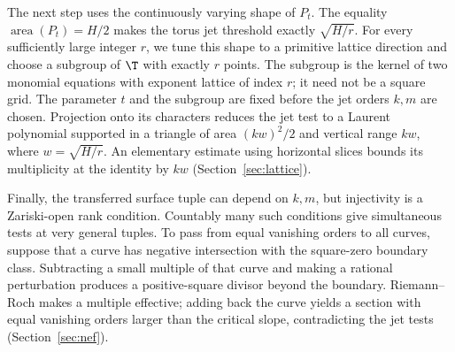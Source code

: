 The next step uses the continuously varying shape of $P_t$. The equality
$\operatorname{area}(P_t)=H/2$ makes the torus jet threshold exactly
$\sqrt{H/r}$.
For every sufficiently large integer $r$, we tune this shape to a primitive
lattice direction and choose a subgroup of $\T$ with exactly $r$ points.
The subgroup is the kernel of two monomial equations with exponent
lattice of index $r$; it need not be a square grid. The parameter $t$ and
the subgroup are fixed before the jet orders $k,m$ are chosen.
Projection onto its characters reduces the jet test to a Laurent polynomial
supported in a triangle of area $(kw)^2/2$ and vertical range $kw$, where
$w=\sqrt{H/r}$. An elementary estimate using horizontal slices bounds its
multiplicity at the identity by $kw$ (Section~\ref{sec:lattice}).

Finally, the transferred surface tuple can depend on $k,m$, but injectivity
is a Zariski-open rank condition. Countably many such conditions give
simultaneous tests at very general tuples. To pass from equal vanishing
orders to all curves, suppose that a curve has negative intersection with
the square-zero boundary class. Subtracting a small multiple of that curve
and making a rational perturbation produces a positive-square divisor
beyond the boundary. Riemann--Roch makes a multiple effective; adding back
the curve yields a section with equal vanishing orders larger than the
critical slope, contradicting the jet tests (Section~\ref{sec:nef}).
